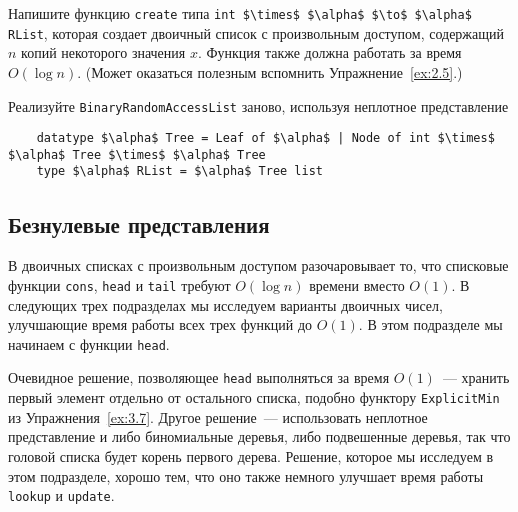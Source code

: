 \begin{exercise}\label{ex:9.2}
  Напишите функцию \lstinline!create! типа 
  \lstinline!int $\times$ $\alpha$ $\to$ $\alpha$ RList!, которая создает
  двоичный список с произвольным доступом, содержащий $n$ копий
  некоторого значения $x$. Функция также должна работать за время
  $O(\log n)$. (Может оказаться полезным вспомнить Упражнение~\ref{ex:2.5}.)
\end{exercise}

\begin{exercise}\label{ex:9.3}
  Реализуйте \lstinline!BinaryRandomAccessList! заново, используя
  неплотное представление
  \begin{lstlisting}
    datatype $\alpha$ Tree = Leaf of $\alpha$ | Node of int $\times$ $\alpha$ Tree $\times$ $\alpha$ Tree
    type $\alpha$ RList = $\alpha$ Tree list
  \end{lstlisting}
\end{exercise}

\subsection{Безнулевые представления}
\label{sc:9.2.2}

В двоичных списках с произвольным доступом разочаровывает то, что
списковые функции \lstinline!cons!, \lstinline!head! и
\lstinline!tail! требуют $O(\log n)$ времени вместо $O(1)$. В
следующих трех подразделах мы исследуем варианты двоичных чисел,
улучшающие время работы всех трех функций до $O(1)$. В этом подразделе
мы начинаем с функции \lstinline!head!.

\begin{remark}
  Очевидное решение, позволяющее \lstinline!head! выполняться за время
  $O(1)$~--- хранить первый элемент отдельно от остального списка,
  подобно функтору \lstinline!ExplicitMin! из
  Упражнения~\ref{ex:3.7}. Другое решение~--- использовать неплотное
  представление и либо биномиальные деревья, либо подвешенные деревья, так что
  головой списка будет корень первого дерева. Решение, которое мы
  исследуем в этом подразделе, хорошо тем, что оно также немного
  улучшает время работы \lstinline!lookup! и \lstinline!update!.
\end{remark}

